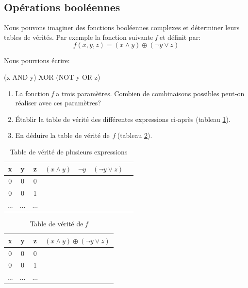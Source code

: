 \documentclass[a4paper,11pt]{article}
\begin{document}
\begin{Form}
\subsection{Opérations booléennes}
Nous pouvons imaginer des fonctions booléennes complexes et déterminer leurs tables de vérités. Par exemple la fonction suivante \emph{f} et définit par:
$$f(x,y,z)=(x\land y)\oplus (\lnot y \lor z)$$
\begin{commentprof}
Nous pourrions écrire:
\begin{center}
(x AND y) XOR (NOT y OR z)
\end{center}
\end{commentprof}
\begin{activite}
\begin{enumerate}
\item La fonction \emph{f} a trois paramètres. Combien de combinaisons possibles peut-on réaliser avec ces paramètres?
\item Établir la table de vérité des différentes expressions ci-après (tableau \ref{expression}).
\item En déduire la table de vérité de~\emph{f} (tableau \ref{f}).
\end{enumerate}
\end{activite}

\begin{table}[!h]
\begin{center}
\begin{tabular}{|ccc|*4{c|}}
\hline 
x & y & z & $(x\land y)$ & $\lnot y$ & $(\lnot y \lor z)$\\ 
\hline 
0 & 0 & 0 &&&\\
\hline 
0 & 0 & 1 &&&\\
\hline 
... & ... & ... &&&\\
\hline 
\end{tabular}
\caption{\label{expression}Table de vérité de plusieurs expressions}
\end{center}
\end{table} 

\begin{table}[!h]
\begin{center}
\begin{tabular}{|ccc|c|}
\hline 
x & y & z & $(x\land y)\oplus (\lnot y \lor z)$\\ 
\hline 
0 & 0 & 0 &\\
\hline 
0 & 0 & 1 &\\
\hline 
... & ... & ... &\\
\hline 
\end{tabular}
\caption{\label{f}Table de vérité de \emph{f}}
\end{center}
\end{table} 

\end{Form}
\end{document}
